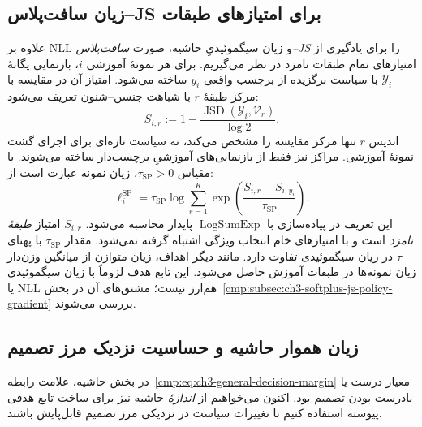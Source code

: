 \subsection{زیان سافت‌پلاس--JS برای امتیازهای طبقات}
\label{cmp:subsec:ch3-softplus-js-objective}
علاوه بر NLL و زیان سیگموئیدیِ حاشیه،
صورت \emph{سافت‌پلاس--JS} را برای یادگیری
از امتیازهای تمام طبقات نامزد در نظر می‌گیریم.
برای هر نمونهٔ آموزشی $i$،
بازنمایی یگانهٔ $\mathscr Y_i$ با سیاست
برگزیده از برچسب واقعی $y_i$ ساخته می‌شود.
امتیاز آن در مقایسه با مرکز طبقهٔ $r$
با شباهت جنسن--شنون تعریف می‌شود:
\[
S_{i,r}:=
1-\frac{\operatorname{JSD}(\mathscr Y_i,\mathcal V_r)}{\log2}.
\]
اندیس $r$ تنها مرکز مقایسه را مشخص
می‌کند، نه سیاست تازه‌ای برای اجرای
گشت نمونهٔ آموزشی. مراکز نیز فقط از
بازنمایی‌های آموزشیِ برچسب‌دار ساخته
می‌شوند.
با مقیاس $\tau_{\mathrm{SP}}>0$، زیان نمونه
عبارت است از:
\begin{equation}\label{cmp:eq:ch3-softplus-js-training-objective}
\boxed{
\ell_i^{\mathrm{SP}}
=\tau_{\mathrm{SP}}
\log\sum_{r=1}^{K}
\exp\left(\frac{S_{i,r}-S_{i,y_i}}{\tau_{\mathrm{SP}}}\right).
}
\end{equation}
این تعریف در پیاده‌سازی با
$\operatorname{LogSumExp}$ پایدار محاسبه می‌شود.
$S_{i,r}$ امتیاز \emph{طبقهٔ نامزد} است
و با امتیازهای خام انتخاب ویژگی اشتباه گرفته نمی‌شود.
مقدار $\tau_{\mathrm{SP}}$ با پهنای
$\tau$ در زیان سیگموئیدی تفاوت دارد.
مانند دیگر اهداف، زیان متوازن از میانگین
وزن‌دار زیان نمونه‌ها در طبقات آموزش حاصل می‌شود.
این تابع هدف لزوماً با زیان سیگموئیدی
یا NLL هم‌ارز نیست؛ مشتق‌های آن در
بخش~\ref{cmp:subsec:ch3-softplus-js-policy-gradient}
بررسی می‌شوند.

\subsection{زیان هموار حاشیه و حساسیت نزدیک مرز تصمیم}
\label{cmp:subsec:ch3-sigmoid-balanced-error}
در بخش حاشیه، علامت
رابطه~\eqref{cmp:eq:ch3-general-decision-margin}
معیار درست یا نادرست بودن تصمیم بود.
اکنون می‌خواهیم از \emph{اندازهٔ}
حاشیه نیز برای ساخت تابع هدفی پیوسته
استفاده کنیم تا تغییرات سیاست
در نزدیکی مرز تصمیم قابل‌پایش باشند.

